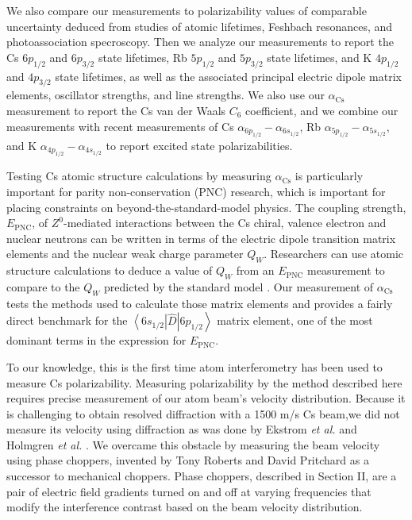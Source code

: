 \documentclass[twocolumn,prl,showpacs,superscriptaddress]{revtex4-1}   %
\newcommand{\brakett}[3]{\left\langle #1 \right|#2\left| #3 \right\rangle}
\newcommand{\acs}{\alpha_{\textrm{Cs}}}
\newcommand{\etalspace}{\textit{et al. }}
\begin{document}
We also compare our measurements to polarizability values of comparable uncertainty deduced from studies of atomic lifetimes, Feshbach resonances, and photoassociation specroscopy. Then we analyze our measurements to report the Cs $6p_{1/2}$ and $6p_{3/2}$ state lifetimes, Rb $5p_{1/2}$ and $5p_{3/2}$ state lifetimes, and K $4p_{1/2}$ and $4p_{3/2}$ state lifetimes, as well as the associated principal electric dipole matrix elements, oscillator strengths, and line strengths. 
We also use our $\acs$ measurement to report the Cs van der Waals $C_6$ coefficient,
and we combine our measurements with recent measurements of 
Cs $\alpha_{6p_{1/2}} - \alpha_{6s_{1/2}}$,
Rb $\alpha_{5p_{1/2}} - \alpha_{5s_{1/2}}$, and
K $\alpha_{4p_{1/2}} - \alpha_{4s_{1/2}}$ to report excited state polarizabilities.

Testing Cs atomic structure calculations by measuring $\acs$ is particularly important for parity non-conservation (PNC) research, which is important for placing constraints on beyond-the-standard-model physics. The coupling strength, $E_{\mathrm{PNC}}$, of $Z^0$-mediated interactions between the Cs chiral, valence electron and nuclear neutrons can be written in terms of the electric dipole transition matrix elements and the nuclear weak charge parameter $Q_W$. Researchers can use atomic structure calculations to deduce a value of $Q_W$ from an $E_{\mathrm{PNC}}$ measurement \cite{Cho1997} to compare to the $Q_W$ predicted by the standard model \cite{Bouchiat1999,Dzuba2012}. Our measurement of $\acs$ tests the methods used to calculate those matrix elements and provides a fairly direct benchmark for the $\brakett{6s_{1/2}}{\hat{D}}{6p_{1/2}}$ matrix element, one of the most dominant terms in the expression for $E_{\mathrm{PNC}}$.

To our knowledge, this is the first time atom interferometry has been used to measure Cs polarizability. Measuring polarizability by the method described here requires precise measurement of our atom beam's velocity distribution. Because it is challenging to obtain resolved diffraction with a 1500 m/s Cs beam,we did not measure its velocity using diffraction as was done by Ekstrom \etalspace and Holmgren \etalspace \cite{Ekstrom1995,Holmgren2010}. We overcame this obstacle by measuring the beam velocity using phase choppers,  invented by Tony Roberts and David Pritchard \cite{Roberts2002,Roberts2004} as a successor to mechanical choppers.
Phase choppers, described in Section II, are a pair of electric field gradients turned on and off at varying frequencies that modify the interference contrast based on the beam velocity distribution. 
\end{document}
